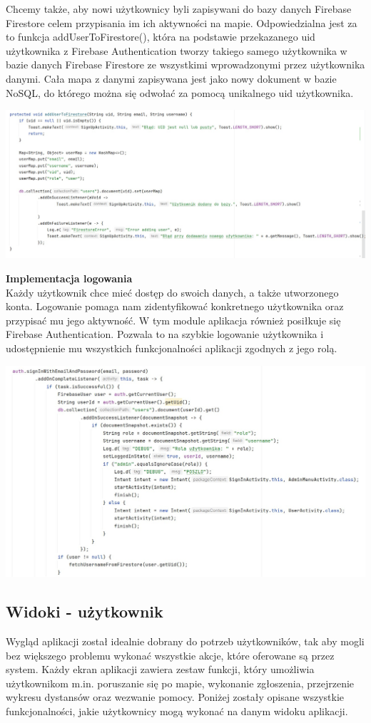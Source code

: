 Chcemy także, aby nowi użytkownicy byli zapisywani do bazy danych Firebase Firestore celem przypisania im ich aktywności na mapie. Odpowiedzialna jest za to funkcja addUserToFirestore(), która na podstawie przekazanego uid użytkownika z Firebase Authentication tworzy takiego samego użytkownika w bazie danych Firebase Firestore ze wszystkimi wprowadzonymi przez użytkownika danymi. Cała mapa z danymi zapisywana jest jako nowy dokument w bazie NoSQL, do którego można się odwołać za pomocą unikalnego uid użytkownika.\\
\noindent
\begin{minipage}{\linewidth}
    \label{lst:addtofirestore}
    \centering
    \includegraphics[width=0.6\linewidth]{img/kod/imp-addtofs.jpg}
\end{minipage}
\textbf{Implementacja logowania}\\
\indent Każdy użytkownik chce mieć dostęp do swoich danych, a także utworzonego konta. Logowanie pomaga nam zidentyfikować konkretnego użytkownika oraz przypisać mu jego aktywność. W tym module aplikacja również posiłkuje się Firebase Authentication. Pozwala to na szybkie logowanie użytkownika i udostępnienie mu wszystkich funkcjonalności aplikacji zgodnych z jego rolą.\\
\noindent
\begin{minipage}{\linewidth}
    \label{lst:login}
    \centering
    \includegraphics[width=0.6\linewidth]{img/kod/imp-login1.jpg}
\end{minipage}


\subsection{Widoki - użytkownik}
Wygląd aplikacji został idealnie dobrany do potrzeb użytkowników, tak aby mogli bez większego problemu wykonać wszystkie akcje, które oferowane są przez system. Każdy ekran aplikacji zawiera zestaw funkcji, który umożliwia użytkownikom m.in. poruszanie się po mapie, wykonanie zgłoszenia, przejrzenie wykresu dystansów oraz wezwanie pomocy. Poniżej zostały opisane wszystkie funkcjonalności, jakie użytkownicy mogą wykonać na danym widoku aplikacji.
\\

